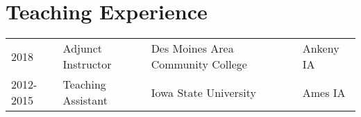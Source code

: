 \documentclass[letterpaper]{article}
\begin{document}
\section*{Teaching Experience}


\begin{tabular}{@{}llll}
2018 & Adjunct Instructor & Des Moines Area Community College & Ankeny IA \\
2012-2015 & Teaching Assistant & Iowa State University & Ames IA \\
\end{tabular}

\begin{comment}
\section*{References}
\begin{minipage}{0.45\linewidth}
 Helle Bunzel (Primary Advisor) \\
    Associate Professor\\
    Department of Economics\\
    Iowa State University\\
    Ames, IA 50011\\
    (515) 294-6163\\
    hbunzel@iastate.edu
\end{minipage}
\begin{minipage}{0.45\linewidth}
Peter Orazem\\
    University Professor of Economics\\
    Department of Economics\\
    Iowa State University\\
    Ames, IA 50011\\
    (515) 294-8656\\
    pfo@iastate.edu
\end{minipage}

\bigskip

\begin{minipage}{0.45\linewidth}
Ot\'avio Bartalotti\\
    Assistant Professor of Economics\\
    Department of Economics\\
    Iowa State University\\
    Ames, IA 50011\\
    (515) 294-1085 \\
    bartalot@iastate.edu

\end{minipage}
\bigskip
\end{comment}
\end{document}
